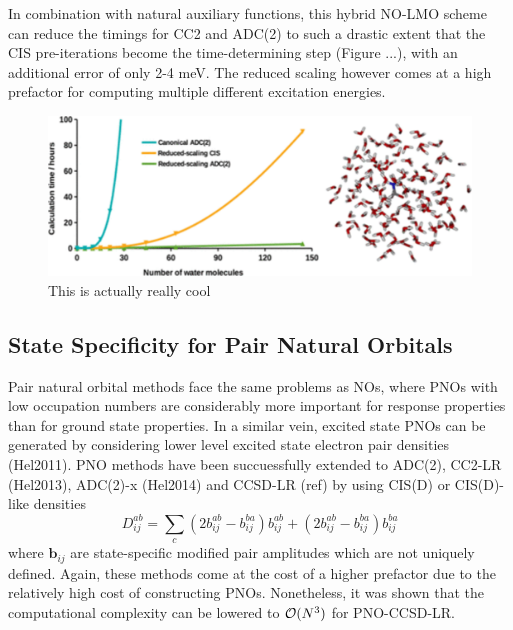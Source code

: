 In combination with natural auxiliary functions, this hybrid NO-LMO scheme can reduce the timings for CC2 and ADC(2) to such a drastic extent that the CIS pre-iterations become the time-determining step (Figure ...), with an additional error of only 2-4 meV. The reduced scaling however comes at a high prefactor for computing multiple different excitation energies. 

\begin{figure}
\centering
\includegraphics[scale=1.0]{Pics/mester_adc.png}
\caption{This is actually really cool}
\end{figure}


\subsection{State Specificity for Pair Natural Orbitals}

Pair natural orbital methods face the same problems as NOs, where PNOs with low occupation numbers are considerably more important for response properties than for ground state properties. In a similar vein, excited state PNOs can be generated by considering lower level excited state electron pair densities (Hel2011). PNO methods have been succuessfully extended to ADC(2), CC2-LR (Hel2013), ADC(2)-x (Hel2014) and CCSD-LR (ref) by using CIS(D) or CIS(D)-like densities
\begin{equation}
D_{ij}^{ab} = \sum_c \left( 2b_{ij}^{ab} - b_{ij}^{ba} \right) b_{ij}^{ab} + \left( 2b_{ij}^{ab} - b_{ij}^{ba} \right) b_{ij}^{ba}
\end{equation}
\noindent where $\mathbf{b}_{ij}$ are state-specific modified pair amplitudes which are not uniquely defined. Again, these methods come at the cost of a higher prefactor due to the relatively high cost of constructing PNOs. Nonetheless, it was shown that the computational complexity can be lowered to $\mathcal{O}(N^{3})$ for PNO-CCSD-LR. 


